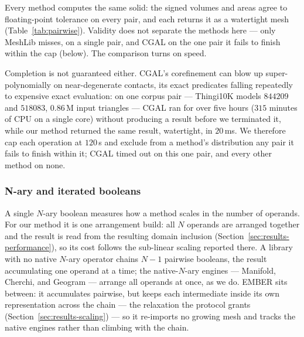 \documentclass{egpubl}
\begin{document}
\begin{table}[t]
\centering
\caption{Pairwise boolean over the $1000$-pair corpus of Section~\ref{sec:results-scaling} ($100$k--$1$M triangles per operand), one boolean per pair, on an Apple M4 Max. Median wall-clock, geometric-mean slowdown relative to our method, and valid outputs, graded by the oracle of Section~\ref{sec:results-scaling}; CGAL's single timeout is reported in the text.}
\label{tab:pairwise}
\small

\end{table}

Every method computes the same solid: the signed volumes and areas agree to floating-point tolerance on every pair, and each returns it as a watertight mesh (Table~\ref{tab:pairwise}). Validity does not separate the methods here --- only MeshLib misses, on a single pair, and CGAL on the one pair it fails to finish within the cap (below). The comparison turns on speed.

Completion is not guaranteed either. CGAL's corefinement can blow up super-polynomially on near-degenerate contacts, its exact predicates falling repeatedly to expensive exact evaluation: on one corpus pair --- Thingi10K models $844209$ and $518083$, $0.86$\,M input triangles --- CGAL ran for over five hours ($315$ minutes of CPU on a single core) without producing a result before we terminated it, while our method returned the same result, watertight, in $20$\,ms. We therefore cap each operation at $120$\,s and exclude from a method's distribution any pair it fails to finish within it; CGAL timed out on this one pair, and every other method on none.

\subsubsection{N-ary and iterated booleans}
\label{sec:results-nary}

A single $N$-ary boolean measures how a method scales in the number of operands. For our method it is one arrangement build: all $N$ operands are arranged together and the result is read from the resulting domain inclusion (Section~\ref{sec:results-performance}), so its cost follows the sub-linear scaling reported there. A library with no native $N$-ary operator chains $N{-}1$ pairwise booleans, the result accumulating one operand at a time; the native-$N$-ary engines --- Manifold, Cherchi, and Geogram --- arrange all operands at once, as we do. EMBER sits between: it accumulates pairwise, but keeps each intermediate inside its own representation across the chain --- the relaxation the protocol grants (Section~\ref{sec:results-scaling}) --- so it re-imports no growing mesh and tracks the native engines rather than climbing with the chain.
\end{document}

